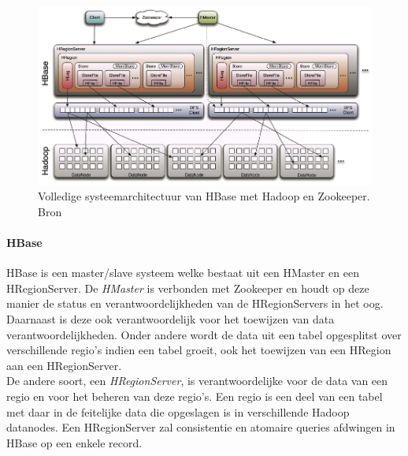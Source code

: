 \begin{figure}[ht!]
\centering
\includegraphics[width=\linewidth]{img/Hbase-structure.png}
\caption{Volledige systeemarchitectuur van HBase met Hadoop en Zookeeper. Bron \cite{ChinHBaseComprehensive}}
\label{fig:Hbase-structure}
\end{figure}

\paragraph{HBase\cite{george2011hbase}} HBase is een master/slave systeem welke bestaat uit een HMaster en een HRegionServer. De \textit{HMaster} is verbonden met Zookeeper en houdt op deze manier de status en verantwoordelijkheden van de HRegionServers in het oog. Daarnaast is deze ook verantwoordelijk voor het toewijzen van data verantwoordelijkheden. Onder andere wordt de data uit een tabel opgesplitst over verschillende regio's indien een tabel groeit, ook het toewijzen van een HRegion aan een HRegionServer.\\
De andere soort, een \textit{HRegionServer}, is verantwoordelijke voor de data van een regio en voor het beheren van deze regio's. Een regio is een deel van een tabel met daar in de feitelijke data die opgeslagen is in verschillende Hadoop datanodes. Een HRegionServer zal consistentie en atomaire queries afdwingen in HBase op een enkele record.  

